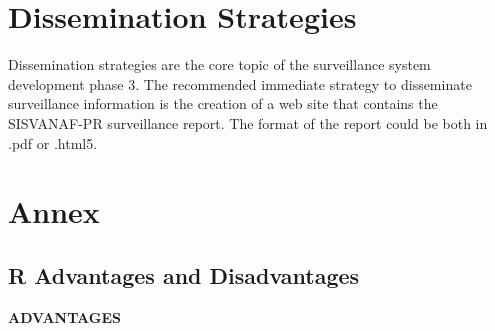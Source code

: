 \documentclass[12pt,letterpaper]{report}
\begin{document}
\section{Dissemination Strategies}
Dissemination strategies are the core topic of the surveillance system development phase 3. The recommended immediate strategy to disseminate surveillance information is the creation of a web site that contains the SISVANAF-PR surveillance report. The format of the report could be both in .pdf or .html5.


\section{Annex}

\subsection{R Advantages and Disadvantages}
\textbf{ADVANTAGES}
\end{document}
